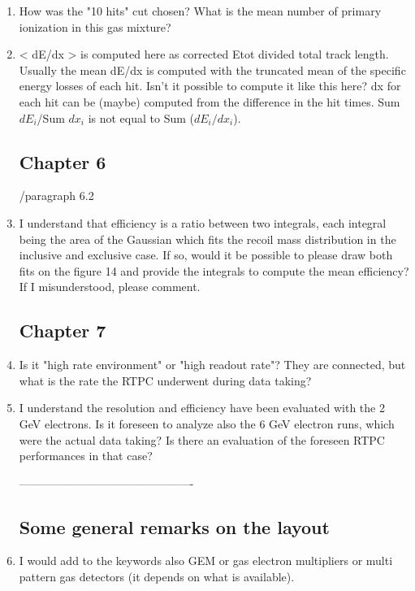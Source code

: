 \documentclass[a4paper,11pt,twoside]{article}
\begin{document}
\begin{enumerate}
\item How was the "10 hits" cut chosen? What is the mean number of primary ionization in this gas mixture?
\textcolor{blue}{ } 

\item < dE/dx > is computed here as corrected Etot divided total track length. Usually the mean dE/dx is computed with the truncated mean of the specific energy losses of each hit. Isn't it possible to compute it like this here? dx for each hit can be (maybe) computed from the difference in the hit times. Sum $dE_{i}$/Sum $dx_{i}$ is not equal to Sum ($dE_{i}/dx_{i}$).
\textcolor{blue}{ } 

\subsection*{ Chapter 6}
	/paragraph 6.2
\item I understand that efficiency is a ratio between two integrals, each integral being the area of the Gaussian which fits the recoil mass distribution in the inclusive and exclusive case. If so, would it be possible to please draw both fits on the figure 14 and provide the integrals to compute the mean efficiency? If I misunderstood, please comment.
\textcolor{blue}{ } 

\subsection*{ Chapter 7} 
\item Is it "high rate environment" or "high readout rate"? They are connected, but what is the rate the RTPC underwent during data taking?
\textcolor{blue}{ } 

\item I understand the resolution and efficiency have been evaluated with the 2 GeV electrons. Is it foreseen to analyze also the 6 GeV electron runs, which were the actual data taking? Is there an evaluation of the foreseen RTPC performances in that case?
\textcolor{blue}{ } 

----------------------------------------------
\subsection*{ Some general remarks on the layout}

\item I would add to the keywords also GEM or gas electron multipliers or multi pattern gas detectors (it depends on what is available).
\textcolor{blue}{ } 


\end{enumerate}
\end{document}

